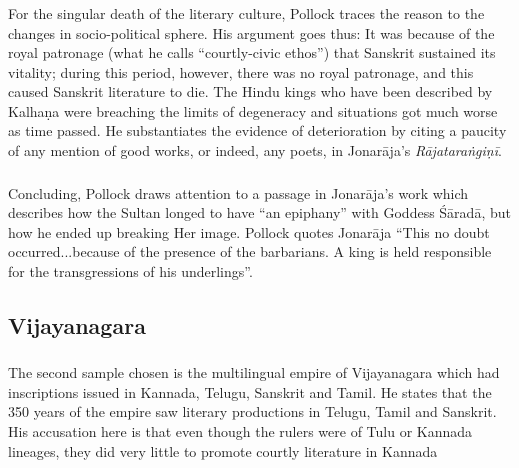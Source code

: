 \subsubsection{} For the singular death of the literary culture, Pollock traces the reason to the changes in socio-political sphere. His argument goes thus: It was because of the royal patronage (what he calls “courtly-civic ethos”) that Sanskrit sustained its vitality; during this period, however, there was no royal patronage, and this caused Sanskrit literature to die. The Hindu kings who have been described by Kalhaṇa were breaching the limits of degeneracy and situations got much worse as time passed. He substantiates the evidence of deterioration by citing a paucity of any mention of good works, or indeed, any poets, in Jonarāja’s {\sl Rājataraṅgiṇī}.

\subsubsection{} Concluding, Pollock draws attention to a passage in Jonarāja’s work which describes how the Sultan longed to have “an epiphany” with Goddess Śāradā, but how he ended up breaking Her image. Pollock quotes Jonarāja “This no doubt occurred...because of the presence of the barbarians. A king is held responsible for the transgressions of his underlings”. 

\subsection{Vijayanagara}

\subsubsection{} The second sample chosen is the multilingual empire of Vijayanagara which had inscriptions issued in Kannada, Telugu, Sanskrit and Tamil. He states that the 350 years of the empire saw literary productions in Telugu, Tamil and Sanskrit. His accusation here is that even though the rulers were of Tulu or Kannada lineages, they did very little to promote courtly literature in Kannada
\newpage

